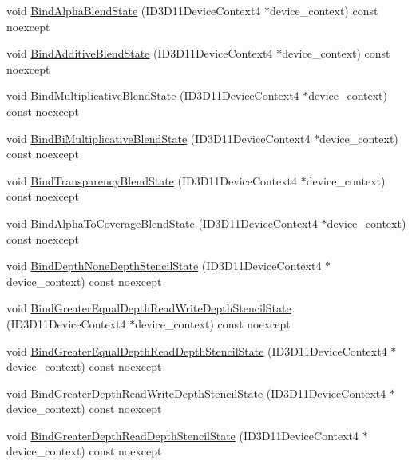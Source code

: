 \begin{DoxyCompactItemize}
\item 
void \hyperlink{classmage_1_1_rendering_state_manager_aa8515490c3aa764cfb8bb9a1121ced03}{Bind\+Alpha\+Blend\+State} (I\+D3\+D11\+Device\+Context4 $\ast$device\+\_\+context) const noexcept
\item 
void \hyperlink{classmage_1_1_rendering_state_manager_a0ae04882682ccccd4e75830bd2b4159b}{Bind\+Additive\+Blend\+State} (I\+D3\+D11\+Device\+Context4 $\ast$device\+\_\+context) const noexcept
\item 
void \hyperlink{classmage_1_1_rendering_state_manager_aaeeba94b7318056208af5a3b8ef40c44}{Bind\+Multiplicative\+Blend\+State} (I\+D3\+D11\+Device\+Context4 $\ast$device\+\_\+context) const noexcept
\item 
void \hyperlink{classmage_1_1_rendering_state_manager_a91f9414dde728ddf889fc39ac14e0bc4}{Bind\+Bi\+Multiplicative\+Blend\+State} (I\+D3\+D11\+Device\+Context4 $\ast$device\+\_\+context) const noexcept
\item 
void \hyperlink{classmage_1_1_rendering_state_manager_adfbbfa46b7ddad2083f03eafea13bc1c}{Bind\+Transparency\+Blend\+State} (I\+D3\+D11\+Device\+Context4 $\ast$device\+\_\+context) const noexcept
\item 
void \hyperlink{classmage_1_1_rendering_state_manager_a358729c6b5f9aac89b95842bd095ec93}{Bind\+Alpha\+To\+Coverage\+Blend\+State} (I\+D3\+D11\+Device\+Context4 $\ast$device\+\_\+context) const noexcept
\item 
void \hyperlink{classmage_1_1_rendering_state_manager_ab3006eac54bc9027975529484e897d33}{Bind\+Depth\+None\+Depth\+Stencil\+State} (I\+D3\+D11\+Device\+Context4 $\ast$device\+\_\+context) const noexcept
\item 
void \hyperlink{classmage_1_1_rendering_state_manager_acaff9c2ced6147953c9f66a859238dc1}{Bind\+Greater\+Equal\+Depth\+Read\+Write\+Depth\+Stencil\+State} (I\+D3\+D11\+Device\+Context4 $\ast$device\+\_\+context) const noexcept
\item 
void \hyperlink{classmage_1_1_rendering_state_manager_a746c39e78dc0ede638624f513e4bb380}{Bind\+Greater\+Equal\+Depth\+Read\+Depth\+Stencil\+State} (I\+D3\+D11\+Device\+Context4 $\ast$device\+\_\+context) const noexcept
\item 
void \hyperlink{classmage_1_1_rendering_state_manager_aecae68a287ff478e7dcd75293c3e28cf}{Bind\+Greater\+Depth\+Read\+Write\+Depth\+Stencil\+State} (I\+D3\+D11\+Device\+Context4 $\ast$device\+\_\+context) const noexcept
\item 
void \hyperlink{classmage_1_1_rendering_state_manager_a52ea438f9dde2d461a038932dd104ef8}{Bind\+Greater\+Depth\+Read\+Depth\+Stencil\+State} (I\+D3\+D11\+Device\+Context4 $\ast$device\+\_\+context) const noexcept

\end{DoxyCompactItemize}
